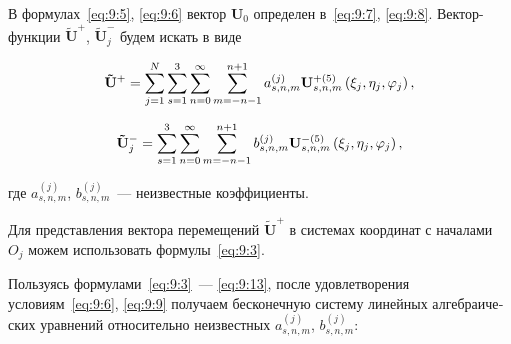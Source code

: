 \begin{russian}
В формулах~\eqref{eq:9:5}, \eqref{eq:9:6} вектор $\mathbf{U}_0$ определен в~\eqref{eq:9:7}, \eqref{eq:9:8}. Вектор-функции $\mathbf{\tilde U}^+$, $\mathbf{\tilde U}_j^-$ будем искать в виде

\begin{equation}
{{\bf{\tilde U}}^ + } = \mathop \sum \limits_{j = 1}^N \sum\limits_{s = 1}^3 {\sum\limits_{n = 0}^\infty  {\sum\limits_{m =  - n - 1}^{n + 1} {a_{s,n,m}^{(j)}} } } {\bf{U}}_{s,n,m}^{ + (5)}\left( {{\xi _j},{\eta _j},{\varphi _j}} \right),
\end{equation}

\begin{equation}
{\bf{\tilde U}}_j^ -  = \sum\limits_{s = 1}^3 {\sum\limits_{n = 0}^\infty  {\sum\limits_{m =  - n - 1}^{n + 1} {b_{s,n,m}^{(j)}} } } {\bf{U}}_{s,n,m}^{ - (5)}\left( {{\xi _j},{\eta _j},{\varphi _j}} \right),
\end{equation}

\noindent где $a_{s,n,m}^{(j)}$, $b_{s,n,m}^{(j)}$~--- неизвестные коэффициенты.

Для представления вектора перемещений $\mathbf{\tilde U}^+$ в системах координат с началами $O_j$ можем использовать формулы~\eqref{eq:9:3}.

Пользуясь формулами~\eqref{eq:9:3}~--- \eqref{eq:9:13}, после удовлетворения условиям~\eqref{eq:9:6}, \eqref{eq:9:9} получаем бесконечную систему линейных алгебраических уравнений относительно неизвестных $a_{s,n,m}^{(j)}$, $b_{s,n,m}^{(j)}$:


\end{russian}
